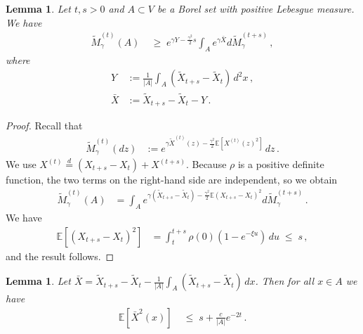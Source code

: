 \documentclass[11pt]{article}
\numberwithin{equation}{section}
\newtheorem{lemma}[theorem]{Lemma}
\theoremstyle{definition}
\renewcommand{\tilde}{\widetilde}          %
\renewcommand{\leq}{\;\leqslant\;}                   %
\renewcommand{\geq}{\;\geqslant\;}                   %
\newcommand{\E}{\mathbb{E}}
\newcommand{\ab}{|}
\begin{document}
\begin{lemma}\label{XY}
Let $t,s > 0$ and $A \subset V$ be a Borel set with positive Lebesgue measure. We have
\begin{align*}
\tilde M^{(t)}_\gamma(A) &\geq  e^{\gamma Y - \frac{\gamma^2}{2}s} \int_A e^{\gamma \bar X} d\tilde M^{(t+s)}_\gamma\,,
\end{align*}
where
\begin{align*}
Y &:= \frac{1}{|A|} \int_A (\tilde X_{t+s} - \tilde X_t) \, d^2x\,, \\
\bar X &:= \tilde X_{t+s} - \tilde X_t - Y\,.
\end{align*}
\end{lemma}

\begin{proof}
Recall that
\begin{align*}
\tilde M^{(t)}_{\gamma}(dz) &:= e^{\gamma \tilde X^{(t)} (z) - \frac{\gamma^2}{2} \E[  X^{(t)}(z)^2]} \, dz\,.
\end{align*}
We use $X^{(t)} \overset{d}{=} (X_{t+s}-X_t) + X^{(t+s)}$. Because $\rho$ is a positive definite function, the two terms on the right-hand side are independent, so we obtain 
\begin{align*}
\tilde M_\gamma^{(t)}(A) &= \int_A e^{\gamma (\tilde X_{t+s} - \tilde X_t) - \frac{\gamma^2}{2} \E(X_{t+s} -  X_t)^2} d \tilde M_\gamma^{(t+s)}\,.
\end{align*}
We have
\begin{align}\label{eq_trivial}
\E[(X_{t+s} -  X_t)^2] &= \int_t^{t+s} \rho(0)(1-e^{-\xi u}) \, du  \leq s\,,
\end{align}
and the result follows.

\end{proof}

\begin{lemma}\label{bar_X}
Let $\bar X = \tilde X_{t+s}-\tilde X_t - \tfrac{1}{\ab A \ab} \int_A (\tilde X_{t+s} - \tilde X_t) \, dx$. Then for all $x \in A$ we have
\begin{align*}
\E [\bar X^2(x)] & \leq s + \tfrac{c}{\ab A \ab} e^{-2t}\,.
\end{align*}
\end{lemma}
\end{document}

